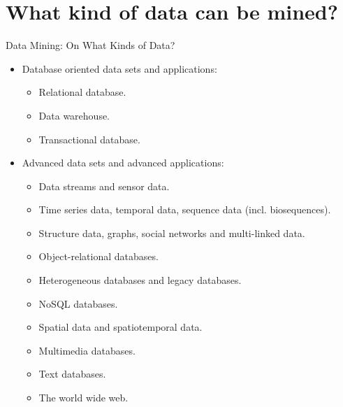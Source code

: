 \section{What kind of data can be mined?}

\begin{frame}{Data Mining: On What Kinds of Data?}
	\begin{itemize}
		\item Database oriented data sets and applications:
		\begin{itemize}
			\item Relational database.
			\item Data warehouse.
			\item Transactional database.
		\end{itemize}
		\item Advanced data sets and advanced applications:
		\begin{itemize}
			\item Data streams and sensor data.
			\item Time series data, temporal data, sequence data (incl. 
			biosequences).
			\item Structure data, graphs, social networks and multi-linked data.
			\item Object-relational databases.
			\item Heterogeneous databases and legacy databases.
			\item NoSQL databases.
			\item Spatial data and spatiotemporal data.
			\item Multimedia databases.
			\item Text databases.
			\item The world wide web.
		\end{itemize}
	\end{itemize}
\end{frame}